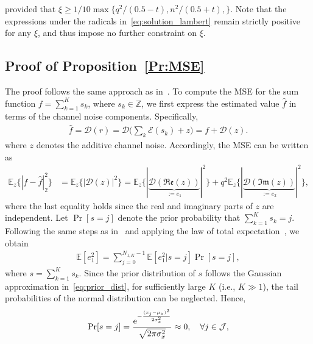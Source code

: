 \documentclass[journal,12pt,onecolumn,draftclsnofoot]{IEEEtran}
\theoremstyle{definition}
\begin{document}
provided that $ \xi \geq 1/10\max\{q^2/(0.5-t),n^2/(0.5+t),\} $.  
Note that the expressions under the radicals in~\eqref{eq:solution_lambert} remain strictly positive for any $\xi$, and thus impose no further constraint on $\xi$.






\subsection{Proof of Proposition~\ref{Pr:MSE}}\label{Ap:proof-MSE}

The proof follows the same approach as in~\cite[Proposition~1]{Razavikia2024Ring}. 
To compute the MSE for the sum function $f = \sum_{k=1}^{K} s_k$, where $s_k \in \mathbb{Z}$, we first express the estimated value $\hat{f}$ in terms of the channel noise components. Specifically, 
\begin{align}
  \hat{f}  = \mathscr{D}(r) = \mathscr{D}\Big(\sum_{k}\mathscr{E}(s_k) + z\Big) =  f + \mathscr{D}(z).  
 \label{eq:noisedecom}
\end{align}
where $z$ denotes the additive channel noise.   Accordingly, the MSE can be written as
\begin{align}
\nonumber
\mathbb{E}_z\big\{|f - \hat{f}|_2^2\big\} & = \mathbb{E}_z\big\{|\mathscr{D}(z)|^2\} =\mathbb{E}_z\big\{{|\underbrace{\mathscr{D}(\mathfrak{Re}(z))}_{:=e_{1}}|}^2\}  + q^2\mathbb{E}_z\big\{{|\underbrace{\mathscr{D}(\mathfrak{Im}(z))}_{:=e_{2}}|}^2\},
\end{align}
where the last equality holds since the real and imaginary parts of $z$ are independent. Let $\Pr[s = j]$ denote the prior probability that $\sum_{k=1}^{K} s_k = j$.  Following the same steps as in~\cite[Appendix~B]{razavikia2024blind} and applying the law of total expectation~\cite{goldsmith2005wireless}, we obtain
\begin{align}\label{eq:Expe1e2}
\mathbb{E}[e_1^2]  = \sum\nolimits_{j=0}^{N_{1,K}-1}\mathbb{E}[e_1^2|s=j]\Pr[s=j], 
\end{align}
where $s=\sum_{k=1}^Ks_k$.  Since the prior distribution of $s$ follows the Gaussian approximation in~\eqref{eq:prior_dist}, for sufficiently large $K$ (i.e., $K \gg 1$), the tail probabilities of the normal distribution can be neglected. Hence, 
\begin{align*}
    \Pr[s=j] = \frac{{\rm e}^{-\frac{(x_j-\mu_x)^2}{2\sigma_x^2}}}{\sqrt{2\pi \sigma_x^2}}  \approx 0, \quad \forall j \in \mathcal{J}, 
\end{align*}
\end{document}
